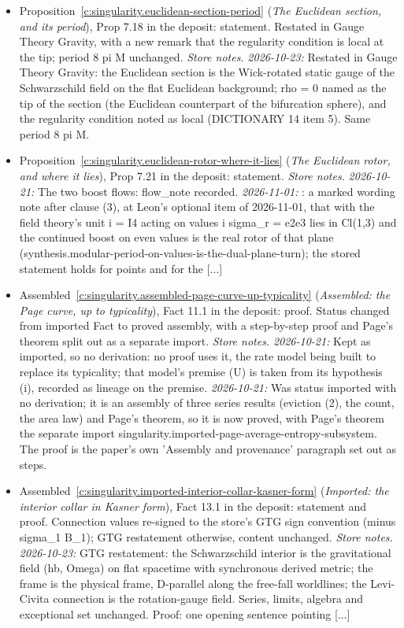 \documentclass[11pt]{article}
\theoremstyle{definition}
\theoremstyle{plain}
\begin{document}
\begin{itemize}
\item Proposition~\ref{c:singularity.euclidean-section-period} (\emph{The Euclidean section, and its period}), Prop 7.18 in the deposit: statement. Restated in Gauge Theory Gravity, with a new remark that the regularity condition is local at the tip; period 8 pi M unchanged. \emph{Store notes.} \emph{2026-10-23:} Restated in Gauge Theory Gravity: the Euclidean section is the Wick-rotated static gauge of the Schwarzschild field on the flat Euclidean background; rho = 0 named as the tip of the section (the Euclidean counterpart of the bifurcation sphere), and the regularity condition noted as local (DICTIONARY 14 item 5). Same period 8 pi M.
\item Proposition~\ref{c:singularity.euclidean-rotor-where-it-lies} (\emph{The Euclidean rotor, and where it lies}), Prop 7.21 in the deposit: statement. \emph{Store notes.} \emph{2026-10-21:} The two boost flows: flow\_note recorded. \emph{2026-11-01:} : a marked wording note after clause (3), at Leon's optional item of 2026-11-01, that with the field theory's unit i = I4 acting on values i sigma\_r = e2e3 lies in Cl(1,3) and the continued boost on even values is the real rotor of that plane (synthesis.modular-period-on-values-is-the-dual-plane-turn); the stored statement holds for points and for the [...]
\item Assembled~\ref{c:singularity.assembled-page-curve-up-typicality} (\emph{Assembled: the Page curve, up to typicality}), Fact 11.1 in the deposit: proof. Status changed from imported Fact to proved assembly, with a step-by-step proof and Page's theorem split out as a separate import. \emph{Store notes.} \emph{2026-10-21:} Kept as imported, so no derivation: no proof uses it, the rate model being built to replace its typicality; that model's premise (U) is taken from its hypothesis (i), recorded as lineage on the premise. \emph{2026-10-21:} Was status imported with no derivation; it is an assembly of three series results (eviction (2), the count, the area law) and Page's theorem, so it is now proved, with Page's theorem the separate import singularity.imported-page-average-entropy-subsystem. The proof is the paper's own 'Assembly and provenance' paragraph set out as steps.
\item Assembled~\ref{c:singularity.imported-interior-collar-kasner-form} (\emph{Imported: the interior collar in Kasner form}), Fact 13.1 in the deposit: statement and proof. Connection values re-signed to the store's GTG sign convention (minus sigma\_1 B\_1); GTG restatement otherwise, content unchanged. \emph{Store notes.} \emph{2026-10-23:} GTG restatement: the Schwarzschild interior is the gravitational field (hb, Omega) on flat spacetime with synchronous derived metric; the frame is the physical frame, D-parallel along the free-fall worldlines; the Levi-Civita connection is the rotation-gauge field. Series, limits, algebra and exceptional set unchanged. Proof: one opening sentence pointing [...]

\end{itemize}
\end{document}

